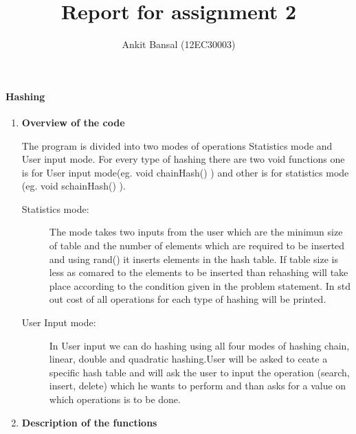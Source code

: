 \documentclass[a4paper,11pt]{article}
\title{Report for assignment 2}
\author{Ankit Bansal (12EC30003)}
\begin{document}
\maketitle

\paragraph{Hashing}
\begin{enumerate}
 \item \textbf{Overview of the code}

The program is divided into two modes of operations Statistics mode and User input mode. For every type of hashing there are two void functions one is for User input mode(eg.  void chainHash() ) and other is for statistics mode (eg. void schainHash() ).
\begin{description}
  \item[Statistics mode:]
 The mode takes two inputs from the user which are the minimun size of table and the  number of elements which are required to be inserted and using rand() it inserts elements in the hash table. If table size is less as comared to the elements to be inserted than  rehashing will take place according to the condition given in the problem statement. In std out cost of all operations for each type of hashing will be printed.
  \item[User Input mode:]
In User input we can do hashing using all four modes of hashing chain, linear, double and quadratic hashing.User will be asked to ceate  a specific hash table and will ask the user to input the operation (search, insert, delete) which he wants to perform and than asks for a value on which operations is to be done.
\end{description}
 \item \textbf{Description of the functions}
\end{enumerate}
\end{document}
